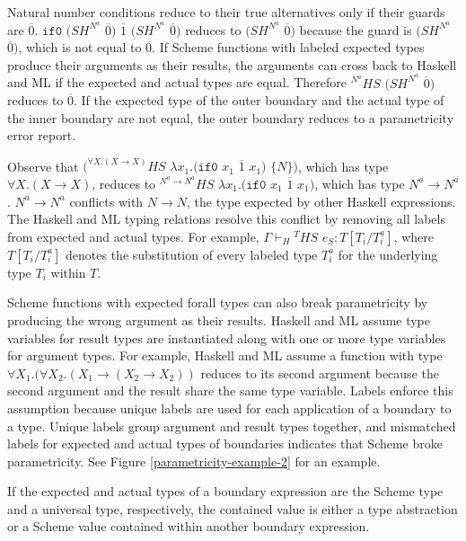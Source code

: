 Natural number conditions reduce to their true alternatives only if their guards are $\overline{0}$.  $\mathtt{if0}$ $(SH^{N^{a}}$ $\overline{0})$ $\overline{1}$ $(SH^{N^{a}}$ $\overline{0})$ reduces to $(SH^{N^{a}}$ $\overline{0})$ because the guard is $(SH^{N^{a}}$ $\overline{0})$, which is not equal to $\overline{0}$.  If Scheme functions with labeled expected types produce their arguments as their results, the arguments can cross back to Haskell and ML if the expected and actual types are equal.  Therefore $^{N^{a}}HS$ $(SH^{N^{a}}$ $\overline{0})$ reduces to $\overline{0}$.  If the expected type of the outer boundary and the actual type of the inner boundary are not equal, the outer boundary reduces to a parametricity error report.

Observe that $(^{\forall X.(X\rightarrow X)}HS$ $\lambda x_{1}.(\mathtt{if0}$ $x_{1}$ $\overline{1}$ $x_{1})$ $\lbrace N\rbrace)$, which has type $\forall X.(X\rightarrow X)$, reduces to $^{N^{a}\rightarrow N^{a}}HS$ $\lambda x_{1}.(\mathtt{if0}$ $x_{1}$ $\overline{1}$ $x_{1})$, which has type $N^{a}\rightarrow N^{a}$.  $N^{a}\rightarrow N^{a}$ conflicts with $N\rightarrow N$, the type expected by other Haskell expressions.  The Haskell and ML typing relations resolve this conflict by removing all labels from expected and actual types.  For example, $\Gamma\vdash_{H}{^{T}H}S$ $e_{S}:T[T_{i}/T^{a}_{i}]$, where $T[T_{i}/T_{i}^{a}]$ denotes the substitution of every labeled type $T_{i}^{a}$ for the underlying type $T_{i}$ within $T$.

Scheme functions with expected forall types can also break parametricity by producing the wrong argument as their results.  Haskell and ML assume type variables for result types are instantiated along with one or more type variables for argument types.  For example, Haskell and ML assume a function with type $\forall X_{1}.(\forall X_{2}.(X_{1}\rightarrow(X_{2}\rightarrow X_{2}))$ reduces to its second argument because the second argument and the result share the same type variable.  Labels enforce this assumption because unique labels are used for each application of a boundary to a type.  Unique labels group argument and result types together, and mismatched labels for expected and actual types of boundaries indicates that Scheme broke parametricity.  See Figure \ref{parametricity-example-2} for an example.



If the expected and actual types of a boundary expression are the Scheme type and a universal type, respectively, the contained value is either a type abstraction or a Scheme value contained within another boundary expression.

